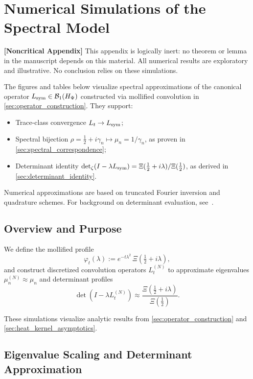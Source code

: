 \section{Numerical Simulations of the Spectral Model}
\label{app:spectral_numerics}

\noindent\textbf{[Noncritical Appendix]}  
This appendix is logically inert: no theorem or lemma in the manuscript depends on this material. All numerical results are exploratory and illustrative. No conclusion relies on these simulations.

\medskip

The figures and tables below visualize spectral approximations of the canonical operator \( L_{\mathrm{sym}} \in \mathcal{B}_1(H_{\Psi}) \) constructed via mollified convolution in \cref{sec:operator_construction}. They support:

\begin{itemize}
  \item Trace-class convergence \( L_t \to L_{\mathrm{sym}} \);
  \item Spectral bijection \( \rho = \tfrac{1}{2} + i\gamma_n \mapsto \mu_n = 1/\gamma_n \), as proven in \cref{sec:spectral_correspondence};
  \item Determinant identity \( \det\nolimits_\zeta(I - \lambda L_{\mathrm{sym}}) = \Xi(\tfrac{1}{2} + i\lambda)/\Xi(\tfrac{1}{2}) \), as derived in \cref{sec:determinant_identity}.
\end{itemize}

Numerical approximations are based on truncated Fourier inversion and quadrature schemes. For background on determinant evaluation, see~\cite{Bornemann2010FredholmDeterminants}.

\subsection*{Overview and Purpose}

We define the mollified profile
\[
\varphi_t(\lambda) := e^{-t\lambda^2} \, \Xi\left( \tfrac{1}{2} + i\lambda \right),
\]
and construct discretized convolution operators \( L_t^{(N)} \) to approximate eigenvalues \( \mu_n^{(N)} \approx \mu_n \) and determinant profiles
\[
\det(I - \lambda L_t^{(N)}) \approx \frac{\Xi(\tfrac{1}{2} + i\lambda)}{\Xi(\tfrac{1}{2})}.
\]

These simulations visualize analytic results from \cref{sec:operator_construction} and \cref{sec:heat_kernel_asymptotics}.

\subsection*{Eigenvalue Scaling and Determinant Approximation}

